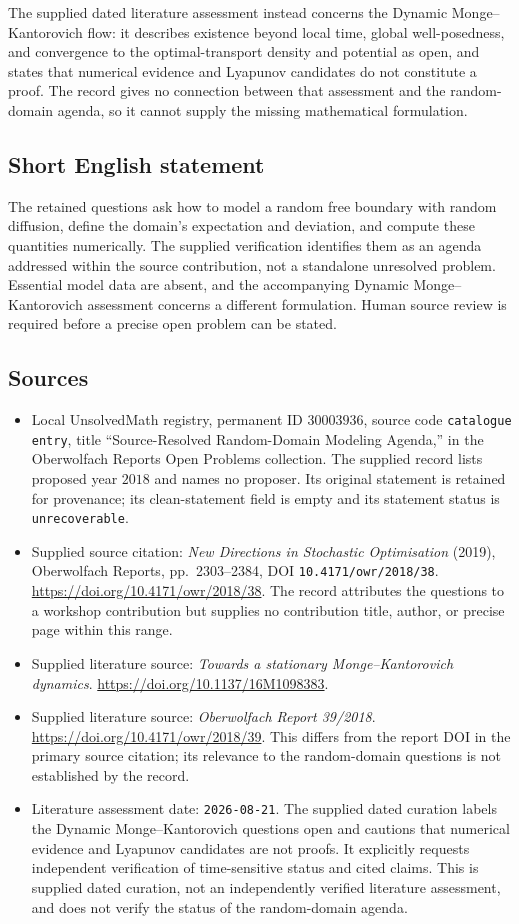 \documentclass[11pt]{article}
\begin{document}
The supplied dated literature assessment instead concerns the Dynamic Monge--Kantorovich flow: it describes existence beyond local time, global well-posedness, and convergence to the optimal-transport density and potential as open, and states that numerical evidence and Lyapunov candidates do not constitute a proof. The record gives no connection between that assessment and the random-domain agenda, so it cannot supply the missing mathematical formulation.
\subsection{Short English statement}
The retained questions ask how to model a random free boundary with random diffusion, define the domain's expectation and deviation, and compute these quantities numerically. The supplied verification identifies them as an agenda addressed within the source contribution, not a standalone unresolved problem. Essential model data are absent, and the accompanying Dynamic Monge--Kantorovich assessment concerns a different formulation. Human source review is required before a precise open problem can be stated.
\subsection{Sources}
\begin{itemize}
\item Local UnsolvedMath registry, permanent ID \(30003936\), source code \texttt{catalogue entry}, title ``Source-Resolved Random-Domain Modeling Agenda,'' in the Oberwolfach Reports Open Problems collection. The supplied record lists proposed year \(2018\) and names no proposer. Its original statement is retained for provenance; its clean-statement field is empty and its statement status is \texttt{unrecoverable}.
\item Supplied source citation: \emph{New Directions in Stochastic Optimisation} (2019), Oberwolfach Reports, pp.\ 2303--2384, DOI \texttt{10.4171/owr/2018/38}. \url{https://doi.org/10.4171/owr/2018/38}. The record attributes the questions to a workshop contribution but supplies no contribution title, author, or precise page within this range.
\item Supplied literature source: \emph{Towards a stationary Monge--Kantorovich dynamics}. \url{https://doi.org/10.1137/16M1098383}.
\item Supplied literature source: \emph{Oberwolfach Report 39/2018}. \url{https://doi.org/10.4171/owr/2018/39}. This differs from the report DOI in the primary source citation; its relevance to the random-domain questions is not established by the record.
\item Literature assessment date: \texttt{2026-08-21}. The supplied dated curation labels the Dynamic Monge--Kantorovich questions open and cautions that numerical evidence and Lyapunov candidates are not proofs. It explicitly requests independent verification of time-sensitive status and cited claims. This is supplied dated curation, not an independently verified literature assessment, and does not verify the status of the random-domain agenda.
\end{itemize}
\end{document}
